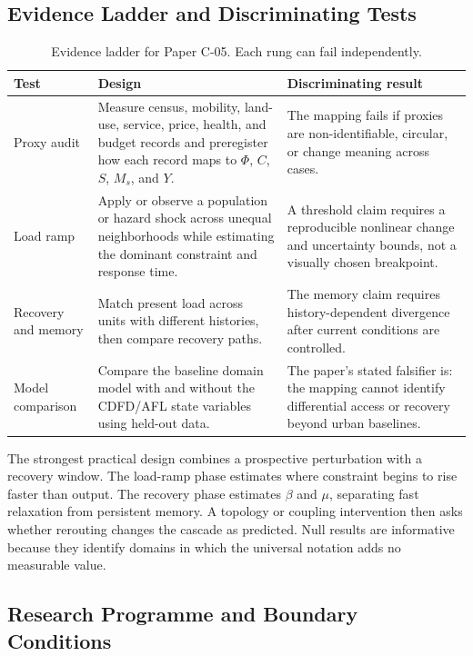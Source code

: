 \documentclass[11pt,a4paper]{article}
\begin{document}
\subsection{Evidence Ladder and Discriminating Tests}

\begin{table}[htbp]
\centering
\small
\caption{Evidence ladder for Paper C-05. Each rung can fail independently.}
\begin{tabularx}{\textwidth}{|p{}|X|X|}
\hline
\textbf{Test} & \textbf{Design} & \textbf{Discriminating result} \\
\hline
Proxy audit & Measure census, mobility, land-use, service, price, health, and budget records and preregister how each record maps to $\Phi$, $C$, $S$, $M_s$, and $Y$. & The mapping fails if proxies are non-identifiable, circular, or change meaning across cases. \\
\hline
Load ramp & Apply or observe a population or hazard shock across unequal neighborhoods while estimating the dominant constraint and response time. & A threshold claim requires a reproducible nonlinear change and uncertainty bounds, not a visually chosen breakpoint. \\
\hline
Recovery and memory & Match present load across units with different histories, then compare recovery paths. & The memory claim requires history-dependent divergence after current conditions are controlled. \\
\hline
Model comparison & Compare the baseline domain model with and without the CDFD/AFL state variables using held-out data. & The paper's stated falsifier is: the mapping cannot identify differential access or recovery beyond urban baselines. \\
\hline
\end{tabularx}
\end{table}

The strongest practical design combines a prospective perturbation with a
recovery window. The load-ramp phase estimates where constraint begins to rise
faster than output. The recovery phase estimates $\beta$ and $\mu$, separating
fast relaxation from persistent memory. A topology or coupling intervention
then asks whether rerouting changes the cascade as predicted. Null results are
informative because they identify domains in which the universal notation adds
no measurable value.

\subsection{Research Programme and Boundary Conditions}
\end{document}
